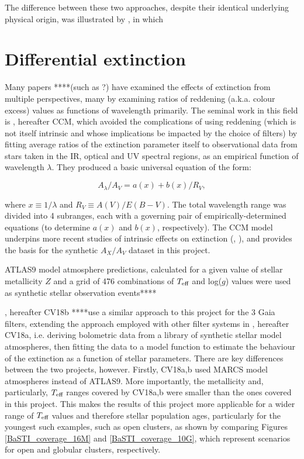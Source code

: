 \documentclass[12pt, a4paper]{report}
\begin{document}
The difference between these two approaches, despite their identical underlying physical origin, was illustrated by \cite{2010ApJ...723..563D}, in which 

\section{Differential extinction}
Many papers ****(such as ?) have examined the effects of extinction from multiple perspectives, many by examining ratios of reddening (a.k.a. colour excess) values as functions of wavelength primarily. The seminal work in this field is \cite{1989ApJ...345..245C}, hereafter CCM, which avoided the complications of using reddening (which is not itself intrinsic and whose implications be impacted by the choice of filters) by fitting average ratios of the extinction parameter itself to observational data from stars taken in the IR, optical \citep{1988ESASP.281b.215C} and UV \citep{1988ApJ...328..734F} spectral regions, as an empirical function of wavelength $\lambda$. They produced a basic universal equation of the form:

\begin{equation}
A_{\lambda}/A_{V} = a(x) + b(x)/R_{V},
\label{CCM_general}
\end{equation}

where $x \equiv 1/\lambda$ and $R_{V} \equiv A(V)/E(B-V)$. The total wavelength range was divided into 4 subranges, each with a governing pair of empirically-determined equations (to determine $a(x)$ and $b(x)$, respectively). The CCM model underpins more recent studies of intrinsic effects on extinction (\cite{2018MNRAS.479L.102C}, \cite{2008PASP..120..583G}), and provides the basis for the synthetic  $A_{X}/A_{V}$ dataset in this project.

ATLAS9 model atmosphere predictions, calculated for a given value of stellar metallicity $Z$ and a grid of 476 combinations of $T_{\textnormal{eff}}$ and log($g$) values \citep{2004astro.ph..5087C} were used as synthetic stellar observation events****

\cite{2018MNRAS.479L.102C}, hereafter CV18b ****use a similar approach to this project for the 3 Gaia filters, extending the approach employed with other filter systems in \cite{2018MNRAS.475.5023C}, hereafter CV18a, i.e. deriving bolometric data from a library of synthetic stellar model atmospheres, then fitting the data to a model function to estimate the behaviour of the extinction as a function of stellar parameters. There are key differences between the two projects, however. Firstly, CV18a,b used MARCS model atmospheres instead of ATLAS9. More importantly, the metallicity and, particularly, $T_{\textnormal{eff}}$ ranges covered by CV18a,b were smaller than the ones covered in this project. This makes the results of this project more applicable for a wider range of $T_{\textnormal{eff}}$ values and therefore stellar population ages, particularly for the youngest such examples, such as open clusters, as shown by comparing Figures \ref{BaSTI_coverage_16M} and \ref{BaSTI_coverage_10G}, which represent scenarios for open and globular clusters, respectively.
\end{document}
